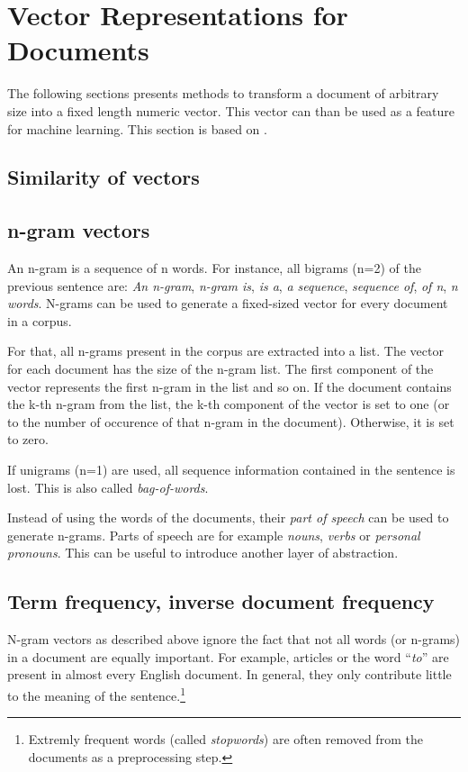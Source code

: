 \section{Vector Representations for Documents}
The following sections presents methods to transform a document of arbitrary size into a fixed length numeric vector. This vector can than be used as a feature for machine learning. This section is based on \cite{martin2009speech}.

\subsection{Similarity of vectors}

\subsection{n-gram vectors}
An n-gram is a sequence of n words. For instance, all bigrams (n=2) of the previous sentence are: \emph{An n-gram}, \emph{n-gram is}, \emph{is a}, \emph{a sequence}, \emph{sequence of}, \emph{of n}, \emph{n words}. N-grams can be used to generate a fixed-sized vector for every document in a corpus.

For that, all n-grams present in the corpus are extracted into a list. The vector for each document has the size of the n-gram list. The first component of the vector represents the first n-gram in the list and so on. If the document contains the k-th n-gram from the list, the k-th component of the vector is set to one (or to the number of occurence of that n-gram in the document). Otherwise, it is set to zero.

If unigrams (n=1) are used, all sequence information contained in the sentence is lost. This is also called \emph{bag-of-words}.

Instead of using the words of the documents, their \emph{part of speech} can be used to generate n-grams. Parts of speech are for example \emph{nouns}, \emph{verbs} or \emph{personal pronouns}. This can be useful to introduce another layer of abstraction.

\subsection{Term frequency, inverse document frequency}
N-gram vectors as described above ignore the fact that not all words (or n-grams) in a document are equally important. For example, articles or the word \enquote{\emph{to}} are present in almost every English document. In general, they only contribute little to the meaning of the sentence.\footnote{Extremly frequent words (called \emph{stopwords}) are often removed from the documents as a preprocessing step.}

